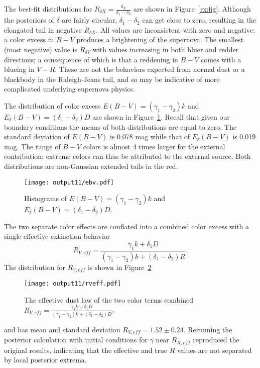 \documentclass[11pt, oneside]{article}   	%
\begin{document}
The best-fit distributions for $R_{\delta X}=\frac{\delta_X}{\delta_1-\delta_2}$ are shown in Figure~\ref{rx:fig}.
Although the posteriors of $\delta$ are fairly circular, $\delta_1-\delta_2$ can get close to zero, resulting in the
elongated tail in negative  $R_{\delta X}$.
All values are inconsistent with zero and negative: a color excess in $B-V$ produces a brightening of the supernova.
The smallest (most negative) value is $R_{\delta V}$  with  values increasing in both bluer and redder directions; a consequence
of which is that
a reddening in $B-V$ comes with a blueing in $V-R$.
These are not the behaviors expected from normal dust or a blackbody in the Raleigh-Jeans tail, and so may be indicative of
more complicated underlying supernova physics.

The distribution of color excess $E(B-V) =(\gamma_1-\gamma_2)k$ and
 $E_\delta(B-V) = (\delta_1-\delta_2)D$ are shown in Figure~\ref{ebv:fig}.
Recall that given our boundary conditions the means of both distributions are equal to zero. 
The standard deviation of $E(B-V)$ is 0.078 mag while that of $E_\delta(B-V)$ is 0.019 mag.
The range of $B-V$ colors is almost 4 times larger for the external contribution:
extreme colors can thus be attributed to the external source. 
Both distributions are non-Gaussian extended tails in the red.
\begin{figure}[htbp] %
   \centering
   \texttt{[image: output11/ebv.pdf]}
   \caption{Histograms of $E(B-V) =(\gamma_1-\gamma_2)k$ and
   $E_\delta(B-V) = (\delta_1-\delta_2)D$.
   \label{ebv:fig}}
\end{figure}

The two separate color effects are conflated into a combined color excess with a single effective extinction behavior
\begin{equation}
R_{V,eff}  = \frac{\gamma_1 k + \delta_1 D}{(\gamma_1-\gamma_2) k + (\delta_1-\delta_2)R}.
\end{equation}
The distribution for $R_{V,eff}$ is shown in Figure~\ref{rveff:fig}
\begin{figure}[htbp] %
   \centering
   \texttt{[image: output11/rveff.pdf]}
   \caption{The effective dust law of the two color terms combined $R_{V,eff}  = \frac{\gamma_1 k + \delta_1 D}{(\gamma_1-\gamma_2) k + (\delta_1-\delta_2)D}$,
   \label{rveff:fig}}
\end{figure}
and has mean and standard deviation  $R_{V,eff}  = 1.52 \pm 0.24$.  
Rerunning the posterior calculation with initial conditions for $\gamma$  near $R_{X,eff}$ reproduced the original results, indicating that
the effective and true $R$ values are not separated by local posterior extrema.
\end{document}

